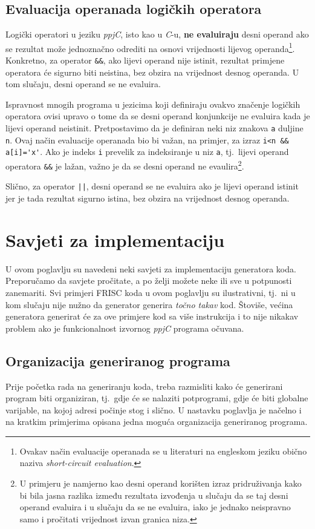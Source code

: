 \documentclass[times, 12pt, utf8]{book}
\begin{document}
\subsection{Evaluacija operanada logičkih operatora}
Logički operatori u jeziku \emph{ppjC}, isto kao u \emph{C}-u, \textbf{ne evaluiraju} desni operand ako se rezultat može jednoznačno odrediti na osnovi vrijednosti lijevog operanda\footnote{Ovakav način evaluacije operanada se u literaturi na engleskom jeziku obično naziva \emph{short-circuit evaluation}.}.
Konkretno, za operator \verb|&&|, ako lijevi operand nije istinit, rezultat primjene operatora će sigurno biti neistina, bez obzira na vrijednost desnog operanda.
U tom slučaju, desni operand se ne evaluira.

Ispravnost mnogih programa u jezicima koji definiraju ovakvo značenje logičkih operatora ovisi upravo o tome da se desni operand konjunkcije ne evaluira kada je lijevi operand neistinit.
Pretpostavimo da je definiran neki niz znakova \verb|a| duljine \verb|n|.
Ovaj način evaluacije operanada bio bi važan, na primjer, za izraz \verb|i<n && a[i]='x'|.
Ako je indeks \verb|i| prevelik za indeksiranje u niz \verb|a|, tj.~lijevi operand operatora \verb|&&| je lažan, važno je da se desni operand ne evaulira\footnote{U primjeru je namjerno kao desni operand korišten izraz pridruživanja kako bi bila jasna razlika između rezultata izvođenja u slučaju da se taj desni operand evaluira i u slučaju da se ne evaluira, iako je jednako neispravno samo i pročitati vrijednost izvan granica niza.}.

Slično, za operator \verb#||#, desni operand se ne evaluira ako je lijevi operand istinit jer je tada rezultat sigurno istina, bez obzira na vrijednost desnog operanda.

\section{Savjeti za implementaciju}
U ovom poglavlju su navedeni neki savjeti za implementaciju generatora koda.
Preporučamo da savjete pročitate, a po želji možete neke ili sve u potpunosti zanemariti.
Svi primjeri FRISC koda u ovom poglavlju su ilustrativni, tj.~ni u kom slučaju nije nužno da generator generira \emph{točno takav} kod.
Štoviše, većina generatora generirat će za ove primjere kod sa više instrukcija i to nije nikakav problem ako je funkcionalnost izvornog \emph{ppjC} programa očuvana.

\subsection{Organizacija generiranog programa}
Prije početka rada na generiranju koda, treba razmisliti kako će generirani program biti organiziran, tj.~gdje će se nalaziti potprogrami, gdje će biti globalne varijable, na kojoj adresi počinje stog i slično.
U nastavku poglavlja je načelno i na kratkim primjerima opisana jedna moguća organizacija generiranog programa.
\end{document}
